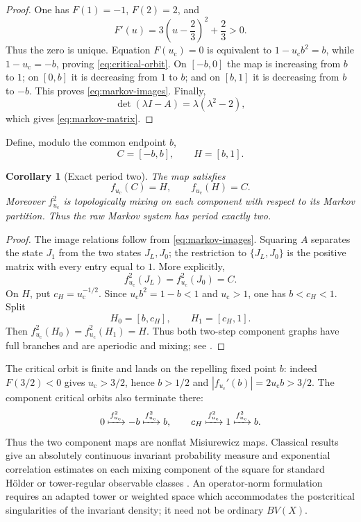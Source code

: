 \documentclass[11pt]{article}
\newtheorem{corollary}[theorem]{Corollary}
\theoremstyle{definition}
\theoremstyle{remark}
\newcommand{\uc}{u_{\mathrm c}}
\begin{document}
\begin{proof}
One has $F(1)=-1$, $F(2)=2$, and
\[
    F'(u)=3\left(u-\frac23\right)^2+\frac23>0.
\]
Thus the zero is unique.  Equation $F(\uc)=0$ is equivalent to $1-\uc b^2=b$, while $1-\uc=-b$, proving \eqref{eq:critical-orbit}.  On $[-b,0]$ the map is increasing from $b$ to $1$; on $[0,b]$ it is decreasing from $1$ to $b$; and on $[b,1]$ it is decreasing from $b$ to $-b$.  This proves \eqref{eq:markov-images}.  Finally,
\[
    \det(\lambda I-A)=\lambda(\lambda^2-2),
\]
which gives \eqref{eq:markov-matrix}.
\end{proof}

Define, modulo the common endpoint $b$,
\begin{equation}\label{eq:cyclic-components}
    C=[-b,b],
    \qquad H=[b,1].
\end{equation}

\begin{corollary}[Exact period two]\label{cor:period-two}
The map satisfies
\begin{equation}\label{eq:component-swap}
    f_{\uc}(C)=H,
    \qquad f_{\uc}(H)=C.
\end{equation}
Moreover $f_{\uc}^2$ is topologically mixing on each component with respect to its Markov partition.  Thus the raw Markov system has period exactly two.
\end{corollary}

\begin{proof}
The image relations follow from \eqref{eq:markov-images}.  Squaring $A$ separates the state $J_1$ from the two states $J_L,J_0$; the restriction to $\{J_L,J_0\}$ is the positive matrix with every entry equal to $1$.  More explicitly,
\[
    f_{\uc}^2(J_L)=f_{\uc}^2(J_0)=C.
\]
On $H$, put $c_H=\uc^{-1/2}$.  Since $\uc b^2=1-b<1$ and $\uc>1$, one has $b<c_H<1$.  Split
\[
    H_0=[b,c_H],
    \qquad H_1=[c_H,1].
\]
Then $f_{\uc}^2(H_0)=f_{\uc}^2(H_1)=H$.  Thus both two-step component graphs have full branches and are aperiodic and mixing; see \citet[Chapter~4]{LindMarcus1995}.
\end{proof}

The critical orbit is finite and lands on the repelling fixed point $b$: indeed $F(3/2)<0$ gives $\uc>3/2$, hence $b>1/2$ and $|f_{\uc}'(b)|=2\uc b>3/2$.  The component critical orbits also terminate there:
\[
    0\xmapsto{f_{\uc}^2}-b\xmapsto{f_{\uc}^2}b,
    \qquad
    c_H\xmapsto{f_{\uc}^2}1\xmapsto{f_{\uc}^2}b.
\]
Thus the two component maps are nonflat Misiurewicz maps.  Classical results give an absolutely continuous invariant probability measure and exponential correlation estimates on each mixing component of the square for standard H\"older or tower-regular observable classes \citep{Misiurewicz1981,Young1992,deMeloVanStrien1993}.  An operator-norm formulation requires an adapted tower or weighted space which accommodates the postcritical singularities of the invariant density; it need not be ordinary $BV(X)$.
\end{document}
